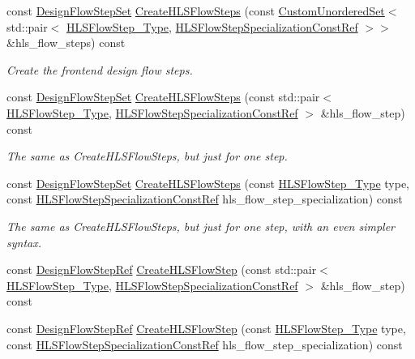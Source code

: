 \begin{DoxyCompactItemize}
const \hyperlink{classDesignFlowStepSet}{Design\+Flow\+Step\+Set} \hyperlink{classHLSFlowStepFactory_a68d109cc1cd6b661a29f89bf76199e93}{Create\+H\+L\+S\+Flow\+Steps} (const \hyperlink{classCustomUnorderedSet}{Custom\+Unordered\+Set}$<$ std\+::pair$<$ \hyperlink{hls__step_8hpp_ada16bc22905016180e26fc7e39537f8d}{H\+L\+S\+Flow\+Step\+\_\+\+Type}, \hyperlink{hls__step_8hpp_a5fdd2edf290c196531d21d68e13f0e74}{H\+L\+S\+Flow\+Step\+Specialization\+Const\+Ref} $>$$>$ \&hls\+\_\+flow\+\_\+steps) const
\begin{DoxyCompactList}\small\item\em Create the frontend design flow steps. \end{DoxyCompactList}\item 
const \hyperlink{classDesignFlowStepSet}{Design\+Flow\+Step\+Set} \hyperlink{classHLSFlowStepFactory_a67751f9e519fe68cad94fd61d08a02f8}{Create\+H\+L\+S\+Flow\+Steps} (const std\+::pair$<$ \hyperlink{hls__step_8hpp_ada16bc22905016180e26fc7e39537f8d}{H\+L\+S\+Flow\+Step\+\_\+\+Type}, \hyperlink{hls__step_8hpp_a5fdd2edf290c196531d21d68e13f0e74}{H\+L\+S\+Flow\+Step\+Specialization\+Const\+Ref} $>$ \&hls\+\_\+flow\+\_\+step) const
\begin{DoxyCompactList}\small\item\em The same as Create\+H\+L\+S\+Flow\+Steps, but just for one step. \end{DoxyCompactList}\item 
const \hyperlink{classDesignFlowStepSet}{Design\+Flow\+Step\+Set} \hyperlink{classHLSFlowStepFactory_a5ee886e0907aa696026b6b222ac3507f}{Create\+H\+L\+S\+Flow\+Steps} (const \hyperlink{hls__step_8hpp_ada16bc22905016180e26fc7e39537f8d}{H\+L\+S\+Flow\+Step\+\_\+\+Type} type, const \hyperlink{hls__step_8hpp_a5fdd2edf290c196531d21d68e13f0e74}{H\+L\+S\+Flow\+Step\+Specialization\+Const\+Ref} hls\+\_\+flow\+\_\+step\+\_\+specialization) const
\begin{DoxyCompactList}\small\item\em The same as Create\+H\+L\+S\+Flow\+Steps, but just for one step, with an even simpler syntax. \end{DoxyCompactList}\item 
const \hyperlink{design__flow__step_8hpp_a9dd6b4474ddf52d41a78b1aaa12ae6c8}{Design\+Flow\+Step\+Ref} \hyperlink{classHLSFlowStepFactory_a6f112350282f875b5ffef9050bd16dde}{Create\+H\+L\+S\+Flow\+Step} (const std\+::pair$<$ \hyperlink{hls__step_8hpp_ada16bc22905016180e26fc7e39537f8d}{H\+L\+S\+Flow\+Step\+\_\+\+Type}, \hyperlink{hls__step_8hpp_a5fdd2edf290c196531d21d68e13f0e74}{H\+L\+S\+Flow\+Step\+Specialization\+Const\+Ref} $>$ \&hls\+\_\+flow\+\_\+step) const
\item 
const \hyperlink{design__flow__step_8hpp_a9dd6b4474ddf52d41a78b1aaa12ae6c8}{Design\+Flow\+Step\+Ref} \hyperlink{classHLSFlowStepFactory_a2a56c258177069c03018a8c4bb5f487b}{Create\+H\+L\+S\+Flow\+Step} (const \hyperlink{hls__step_8hpp_ada16bc22905016180e26fc7e39537f8d}{H\+L\+S\+Flow\+Step\+\_\+\+Type} type, const \hyperlink{hls__step_8hpp_a5fdd2edf290c196531d21d68e13f0e74}{H\+L\+S\+Flow\+Step\+Specialization\+Const\+Ref} hls\+\_\+flow\+\_\+step\+\_\+specialization) const
\end{DoxyCompactItemize}
